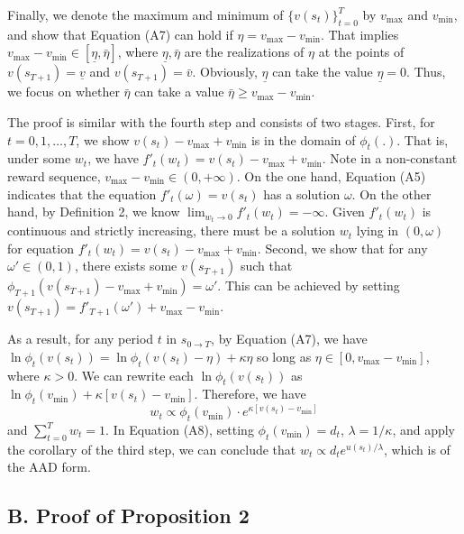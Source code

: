 \documentclass[
  12pt,
]{article}
\begin{document}
Finally, we denote the maximum and minimum of \(\{v(s_t)\}_{t=0}^T\) by
\(v_{\max}\) and \(v_{\min}\), and show that Equation (A7) can hold if
\(\eta = v_{\max} - v_{\min}\). That implies
\(v_{\max}-v_{\min}\in [\underline{\eta},\bar{\eta}]\), where
\(\underline{\eta}, \bar{\eta}\) are the realizations of \(\eta\) at the
points of \(v(s_{T+1})=\underline{v}\) and \(v(s_{T+1})=\bar{v}\).
Obviously, \(\underline{\eta}\) can take the value
\(\underline{\eta}=0\). Thus, we focus on whether \(\bar{\eta}\) can
take a value \(\bar{\eta}\geq v_{\max}-v_{\min}\).

The proof is similar with the fourth step and consists of two stages.
First, for \(t=0,1,…,T\), we show \(v(s_t)-v_{\max}+v_{\min}\) is in the
domain of \(\phi_t(.)\). That is, under some \(w_t\), we have
\(f'_t(w_t)=v(s_t)-v_{\max}+v_{\min}\). Note in a non-constant reward
sequence, \(v_{\max}-v_{\min}\in(0,+\infty)\). On the one hand, Equation
(A5) indicates that the equation \(f'_t(\omega)=v(s_t)\) has a solution
\(\omega\). On the other hand, by Definition 2, we know
\(\lim_{w_t\rightarrow 0}f'_t(w_t)=-\infty\). Given \(f'_t(w_t)\) is
continuous and strictly increasing, there must be a solution \(w_t\)
lying in \((0,\omega)\) for equation
\(f'_t(w_t)=v(s_t)-v_{\max}+v_{\min}\). Second, we show that for any
\(\omega'\in(0,1)\), there exists some \(v(s_{T+1})\) such that
\(\phi_{T+1}(v(s_{T+1})-v_{\max}+v_{\min})=\omega'\). This can be
achieved by setting \(v(s_{T+1})=f'_{T+1}(\omega')+v_{\max}-v_{\min}\).

As a result, for any period \(t\) in \(s_{0\rightarrow T}\), by Equation
(A7), we have \(\ln \phi_t(v(s_t))=\ln\phi_t(v(s_t)-\eta)+\kappa\eta\)
so long as \(\eta\in[0,v_{\max}-v_{\min}]\), where \(\kappa>0\). We can
rewrite each \(\ln \phi_t(v(s_t))\) as
\(\ln \phi_t(v_{\min})+\kappa[v(s_t)-v_{\min}]\). Therefore, we
have\[\tag{A8}
w_t \propto \phi_t(v_{\min})\cdot e^{\kappa[v(s_t)-v_{\min}]}
\]and \(\sum_{t=0}^T w_t=1\). In Equation (A8), setting
\(\phi_t(v_{\min})=d_t\), \(\lambda = 1/\kappa\), and apply the
corollary of the third step, we can conclude that
\(w_t\propto d_t e^{u(s_t)/\lambda}\), which is of the AAD form.

\hypertarget{b.-proof-of-proposition-2}{%
\subsection*{B. Proof of Proposition
2}\label{b.-proof-of-proposition-2}}
\end{document}
